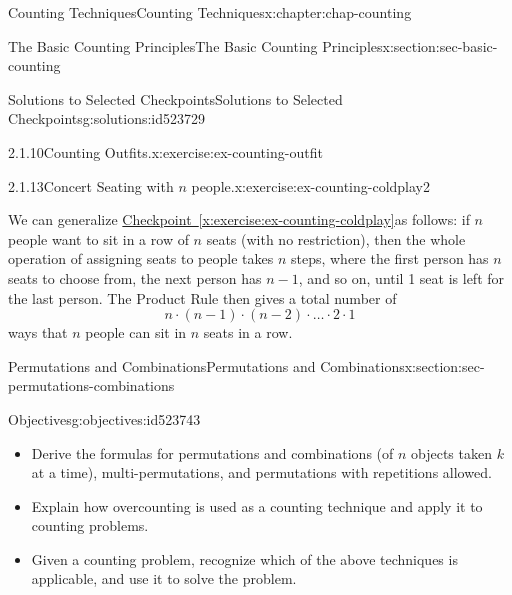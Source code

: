 \documentclass[oneside,10pt,]{book}
\newcommand{\xreffont}{\relax}
\numberwithin{equation}{section}
\begin{document}
\begin{chapterptx}{Counting Techniques}{}{Counting Techniques}{}{}{x:chapter:chap-counting}
\begin{sectionptx}{The Basic Counting Principles}{}{The Basic Counting Principles}{}{}{x:section:sec-basic-counting}
\begin{solutions-subsection-numberless}{Solutions to Selected Checkpoints}{}{Solutions to Selected Checkpoints}{}{}{g:solutions:id523729}
\begin{inlinesolution}{2.1.10}{Counting Outfits.}{x:exercise:ex-counting-outfit}
\begin{sidebyside}{1}{0.15}{0.15}{0}
\begin{sbspanel}{0.7}
{
}%
\end{sbspanel}%
\end{sidebyside}%
\end{inlinesolution}%
\begin{inlinesolution}{2.1.13}{Concert Seating with \(n\) people.}{x:exercise:ex-counting-coldplay2}%
\par\smallskip%
\noindent\hypertarget{g:solution:id523593-main}{}We can generalize \hyperref[x:exercise:ex-counting-coldplay]{Checkpoint~{\xreffont\ref{x:exercise:ex-counting-coldplay}}}as follows: if \(n\) people want to sit in a row of \(n\) seats (with no restriction), then the whole operation of assigning seats to people takes \(n\) steps, where the first person has \(n\) seats to choose from, the next person has \(n-1\), and so on, until 1 seat is left for the last person. The Product Rule then gives a total number of%
\begin{equation*}
n \cdot (n-1) \cdot (n-2) \cdot \ldots \cdot 2 \cdot 1
\end{equation*}
ways that \(n\) people can sit in \(n\) seats in a row.%
\end{inlinesolution}%
\end{solutions-subsection-numberless}
\end{sectionptx}
%
%
\typeout{************************************************}
\typeout{************************************************}
%
\begin{sectionptx}{Permutations and Combinations}{}{Permutations and Combinations}{}{}{x:section:sec-permutations-combinations}
\begin{objectives}{Objectives}{g:objectives:id523743}
%
\begin{itemize}[label=\textbullet]
\item{}Derive the formulas for permutations and combinations (of \(n\) objects taken \(k\) at a time), multi-permutations, and permutations with repetitions allowed.%
\item{}Explain how overcounting is used as a counting technique and apply it to counting problems.%
\item{}Given a counting problem, recognize which of the above techniques is applicable, and use it to solve the problem.%

\end{itemize}
\end{objectives}
\end{sectionptx}
\end{chapterptx}
\end{document}
